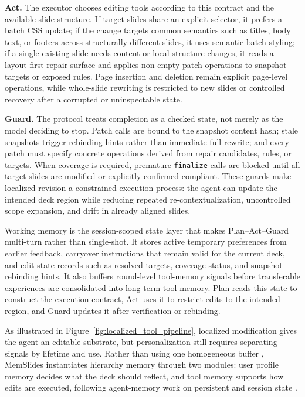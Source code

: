 \documentclass{llmxive}
\providecommand{\methodname}{MemSlides\xspace}
\begin{document}
\textbf{Act.} The executor chooses editing tools according to this contract and
the available slide structure. If target slides share an explicit selector, it
prefers a batch CSS update; if the change targets common semantics such as
titles, body text, or footers across structurally different slides, it uses
semantic batch styling; if a single existing slide needs content or local
structure changes, it reads a layout-first repair surface and applies
non-empty patch operations to snapshot targets or exposed rules. Page insertion
and deletion remain explicit page-level operations, while whole-slide rewriting
is restricted to new slides or controlled recovery after a corrupted or
uninspectable state.

\textbf{Guard.} The protocol treats completion as a checked state, not merely as
the model deciding to stop. Patch calls are bound to the snapshot content hash;
stale snapshots trigger rebinding hints rather than immediate full rewrite; and
every patch must specify concrete operations derived from repair candidates,
rules, or targets. When coverage is required, premature \texttt{finalize} calls
are blocked until all target slides are modified or explicitly confirmed
compliant. These guards make localized revision a constrained execution process:
the agent can update the intended deck region while reducing repeated
re-contextualization, uncontrolled scope expansion, and drift in already aligned
slides.

Working memory is the session-scoped state layer that makes
Plan--Act--Guard multi-turn rather than single-shot. It stores active temporary
preferences from earlier feedback, carryover instructions that remain valid for
the current deck, and edit-state records such as resolved targets, coverage
status, and snapshot rebinding hints. It also buffers round-level tool-memory
signals before transferable experiences are consolidated into long-term tool
memory. Plan reads this state to construct the execution contract, Act uses it
to restrict edits to the intended region, and Guard updates it after
verification or rebinding.



As illustrated in Figure~\ref{fig:localized_tool_pipeline}, localized
modification gives the agent an editable substrate, but personalization still requires separating signals by lifetime and use. Rather
than using one homogeneous buffer
\citep{lewis2020rag,guu2020realm,khandelwal2019knnlm,borgeaud2021retro,izacard2022atlas,wang2023longmem},
\methodname instantiates hierarchy memory through two modules: user profile
memory decides what the deck should reflect, and tool memory supports how edits
are executed, following agent-memory work on persistent and session state
\citep{zhong2023memorybank,packer2023memgpt,park2023generativeagents,xu2025amem,chhikara2025mem0,wang2025mirix,kang2025memoryos,wu2025memoryage,yu2026agemem}.
\end{document}
